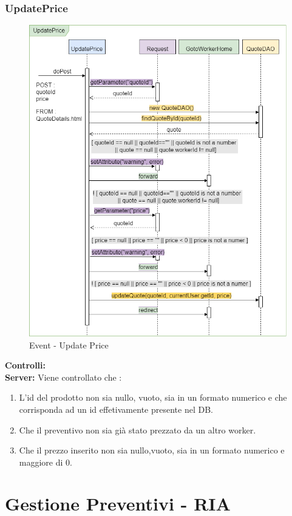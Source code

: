 \documentclass[a4paper, 12pt]{article}
\begin{document}
\subsubsection{UpdatePrice}
\begin{figure}[h!]
	\centering
	\includegraphics[width=1\textwidth]{PureHTML_images/UpdatePrice.png}
	\caption{Event - Update Price}
	\label{figure:updateprice_sd}
\end{figure}
\noindent \textbf{Controlli:}\\
\noindent \textbf{Server:} 
\noindent Viene controllato che :
\begin{enumerate}
\item L'id del prodotto non sia nullo, vuoto, sia in un formato numerico e che corrisponda ad un id effetivamente presente nel DB.
\item Che il preventivo non sia già stato prezzato da un altro worker.
\item Che il prezzo inserito non sia nullo,vuoto, sia in un formato numerico e maggiore di 0.
\end{enumerate}

\newpage
\section{Gestione Preventivi - RIA}
\end{document}
